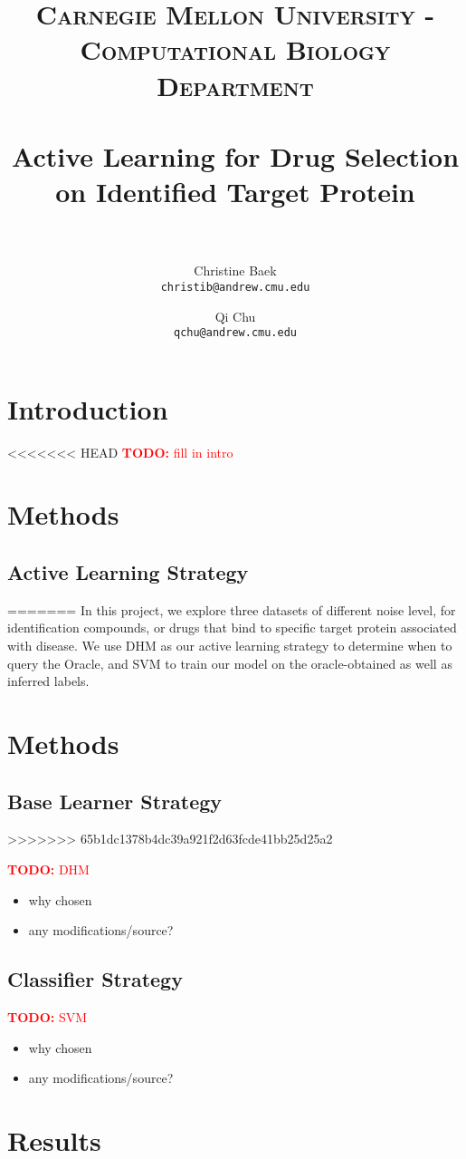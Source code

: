 \documentclass[paper=a4, fontsize=11pt]{scrartcl}
\title{
		\usefont{OT1}{bch}{b}{n}
		\normalfont \normalsize \textsc{Carnegie Mellon University - Computational Biology Department} \\ [25pt]
		\horrule{0.5pt} \\[0.4cm]
		\huge Active Learning for Drug Selection\\ on Identified Target Protein \\
		\horrule{2pt} \\[0.5cm]
}
\author{
  Christine Baek\\
  \normalsize\texttt{christib@andrew.cmu.edu}
  \and
  Qi Chu\\
  \normalsize\texttt{qchu@andrew.cmu.edu}
}
\date{}
\newcommand{\TODO}[1]{\textcolor{red}{\textbf{TODO: } #1}}
\numberwithin{equation}{section}		%
\numberwithin{figure}{section}			%
\numberwithin{table}{section}				%
\begin{document}
\maketitle
\section{Introduction}

<<<<<<< HEAD
\TODO{fill in intro}


\section{Methods}

\subsection{Active Learning Strategy}
=======
In this project, we explore three datasets of different noise level, for identification compounds, or drugs that bind to specific target protein associated with disease. We use DHM as our active learning strategy to determine when to query the Oracle, and SVM to train our model on the oracle-obtained as well as inferred labels. 

\section{Methods}

\subsection{Base Learner Strategy}
>>>>>>> 65b1dc1378b4dc39a921f2d63fcde41bb25d25a2

\TODO{DHM}
\begin{itemize}
\item why chosen
\item any modifications/source?
\end{itemize}

\subsection{Classifier Strategy}

\TODO{SVM}
\begin{itemize}
\item why chosen
\item any modifications/source?
\end{itemize}

\section{Results}
\end{document}
